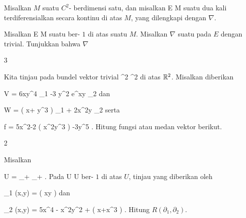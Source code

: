 {}
{

Misalkan $M$ suatu
$C^2$-
berdimensi satu, dan misalkan
\maabb {} { E } { M
} {}
suatu
dua kali terdiferensialkan secara kontinu di atas $M$, yang dilengkapi dengan
$\nabla$.

}
{} {}

{}
{

Misalkan
\maabb {} { E } { M
} {}
suatu
ber-
$1$ di atas suatu
$M$. Misalkan $\nabla$ suatu
pada $E$ dengan
trivial. Tunjukkan bahwa $\nabla$

}
{} {}


{3}
{

Kita tinjau
pada bundel vektor trivial
\maabbdisp {} {\R^2 \times \R } { \R^2
} {}
di atas ${\mathbb R}^2$. Misalkan diberikan

\mavergleichskettedisp
{\vergleichskette
{ V
}
{ =} { 6xy^4 \partial_1 -3 y^2 e^{xy} \partial_2
}
{ } {
}
{ } {
}
{ } {
}
}
{}{}{}
dan

\mavergleichskettedisp
{\vergleichskette
{ W
}
{ =} { \left(  x+ y^3  \right)  \partial_1 + 2x^2y \partial_2
}
{ } {
}
{ } {
}
{ } {
}
}
{}{}{}
serta

\mavergleichskettedisp
{\vergleichskette
{ f
}
{ =} { 5x^2-2  \cos \left(  x^2y^3 \right) -3y^5
}
{ } {
}
{ } {
}
{ } {
}
}
{}{}{.}
Hitung fungsi atau medan vektor berikut.

}
{} {}

{2}
{

Misalkan

\mavergleichskette
{\vergleichskette
{ U
}
{ = }{ \R_+ \times \R_+
}
{  }{
}
{    }{
}
{   }{
}
}
{}{}{.}
Pada
 {U \times \R} { U
} {}
ber-
$1$ di atas $U$, tinjau
yang diberikan oleh

\mavergleichskette
{\vergleichskette
{ \Gamma_1 (x,y)
}
{ = }{ \ln  \left(  xy \right)
}
{  }{
}
{    }{
}
{   }{
}
}
{}{}{}
dan

\mavergleichskette
{\vergleichskette
{ \Gamma_2 (x,y)
}
{ = }{ 5x^4 - \cos  x^2y^2 +  \ln  \left(  x+x^3 \right)
}
{  }{
}
{    }{
}
{   }{
}
}
{}{}{.}
Hitung
$R \left(  \partial_1, \partial_2  \right)$.

}
{} {}
